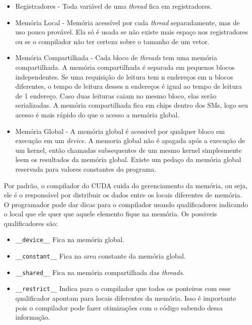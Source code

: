 \begin{itemize}
  \item Registradores - Toda variável de uma \textit{thread} fica em registradores.
  \item Memória Local - Memória acessível por cada \textit{thread} separadamente, mas de uso pouco provável. Ela só é usada se
          não existe mais espaço nos registradores ou se o compilador não ter certeza sobre o tamanho de um vetor.
  \item Memória Compartilhada - Cada bloco de \textit{threads} tem uma memória compartilhada. A memória compartilhada é separada em
          pequenos blocos independentes. Se uma requisição de leitura tem n endereços em n blocos diferentes, o tempo de leitura
          desses n endereços é igual ao tempo de leitura de 1 endereço. Caso duas leituras caiam no mesmo bloco, elas serão
          serializadas. A memória compartilhada fica em chips dentro dos SMs, logo seu acesso é mais rápido do que o acesso a
          memória global.
  \item Memória Global - A memória global é acessivel por qualquer bloco em execução em um \textit{device}. A memoria global não é
          apagada após a execução de um kernel, então chamadas subsequentes de um mesmo kernel simplesmente leem os resultados
          da memória global. Existe um pedaço da memória global reservada para valores constantes do programa.
\end{itemize}

Por padrão, o compilador do CUDA cuida do gerenciamento da memória, ou seja, ele é o responsável por distribuir os dados 
entre os locais diferentes de memória. O programador pode dar dicas para o compilador usando qualificadores indicando o local
que ele quer que aquele elemento fique na memória. Os possiveis qualificadores são:
\begin{itemize}
  \item \verb#__device__# Fica na memória global.
  \item \verb#__constant__#   Fica na area constante da memória global.
  \item \verb#__shared__# Fica na memória compartilhada das \textit{threads}.
  \item \verb#__restrict__# Indica para o compilador que todos os ponteiros com esse qualificador apontam para locais diferentes
                            da memória. Isso é importante pois o compilador pode fazer otimizações com o código sabendo dessa informação.   
\end{itemize}

